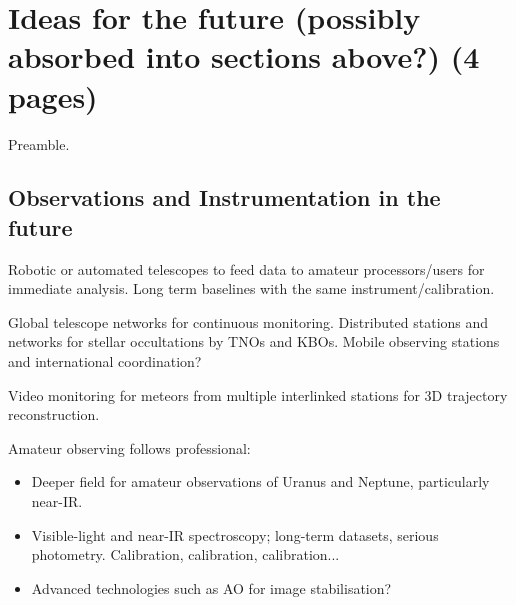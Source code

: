 \documentclass{ar2e}
\begin{document}
\section{Ideas for the future (possibly absorbed into sections above?) (4 pages)}
\label{sec:future}

Preamble.


% 
% 
% 
% 

\subsection{Observations and Instrumentation in the future}
\label{sec:future:obs}

Robotic or automated telescopes to feed data to amateur processors/users for
immediate analysis.  Long term baselines with the same 
instrument/calibration.

Global telescope networks for continuous monitoring.
Distributed stations and networks for stellar occultations by TNOs and KBOs. 
Mobile observing stations and international coordination?

Video monitoring for meteors from multiple interlinked stations for 3D
trajectory reconstruction.

Amateur observing follows professional:
\begin{itemize}
\item Deeper field for amateur observations of Uranus and Neptune, particularly
near-IR.
\item Visible-light and near-IR spectroscopy; long-term datasets, serious
photometry.  Calibration, calibration, calibration...
\item Advanced technologies such as AO for image stabilisation?
\end{itemize}
\end{document}
